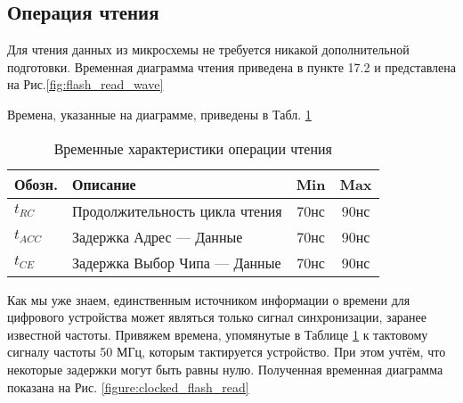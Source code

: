 \subsection{Операция чтения}
\par{Для чтения данных из микросхемы  не требуется никакой дополнительной подготовки. Временная диаграмма чтения приведена в пункте 17.2  и представлена на Рис.\ref{fig:flash_read_wave}}

% 

\par{Времена, указанные на диаграмме, приведены в Табл. \ref{table:flash_read_timings}}

\begin{table}[htbp]
  \centering
  \small
  \begin{tabular}{l|l|c|c}
    Обозн. & Описание & Min & Max \\
    \hline
    $t_{RC}$ & Продолжительность цикла чтения & 70нс & 90нс\\
    $t_{ACC}$ & Задержка Адрес --- Данные & 70нс & 90нс\\
    $t_{CE}$ & Задержка Выбор Чипа --- Данные & 70нс & 90нс\\
  \end{tabular}
  \caption{Временные характеристики операции чтения }
  \label{table:flash_read_timings}
\end{table}

\par{Как мы уже знаем, единственным источником информации о времени для цифрового устройства может являться только сигнал синхронизации, заранее известной частоты. Привяжем времена, упомянутые в Таблице \ref{table:flash_read_timings} к тактовому сигналу частоты 50 МГц, которым тактируется устройство. При этом учтём, что некоторые задержки могут быть равны нулю. Полученная временная диаграмма показана на Рис. \ref{figure:clocked_flash_read}}

